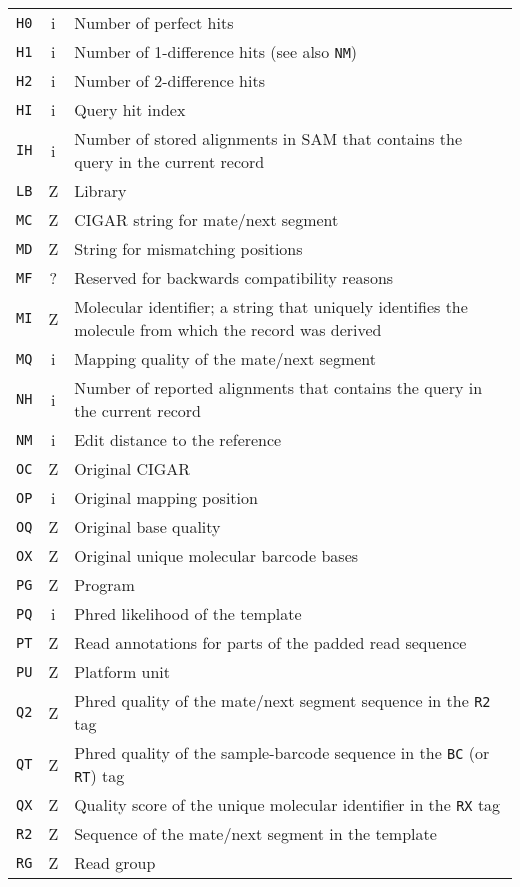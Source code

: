 \documentclass[10pt]{article}
\begin{document}
\begin{center}
\begin{longtable}{ccp{12.5cm}}
  {\tt H0} & i & Number of perfect hits \\
  {\tt H1} & i & Number of 1-difference hits (see also {\tt NM}) \\
  {\tt H2} & i & Number of 2-difference hits \\
  {\tt HI} & i & Query hit index \\
  {\tt IH} & i & Number of stored alignments in SAM that contains the query in the current record \\
  {\tt LB} & Z & Library \\
  {\tt MC} & Z & CIGAR string for mate/next segment \\
  {\tt MD} & Z & String for mismatching positions \\
  {\tt MF} & ? & Reserved for backwards compatibility reasons \\
  {\tt MI} & Z & Molecular identifier; a string that uniquely identifies the molecule from which the record was derived \\
  {\tt MQ} & i & Mapping quality of the mate/next segment \\
  {\tt NH} & i & Number of reported alignments that contains the query in the current record \\
  {\tt NM} & i & Edit distance to the reference \\
  {\tt OC} & Z & Original CIGAR \\
  {\tt OP} & i & Original mapping position \\
  {\tt OQ} & Z & Original base quality \\
  {\tt OX} & Z & Original unique molecular barcode bases \\
  {\tt PG} & Z & Program \\
  {\tt PQ} & i & Phred likelihood of the template \\
  {\tt PT} & Z & Read annotations for parts of the padded read sequence \\
  {\tt PU} & Z & Platform unit \\
  {\tt Q2} & Z & Phred quality of the mate/next segment sequence in the {\tt R2} tag \\
  {\tt QT} & Z & Phred quality of the sample-barcode sequence in the {\tt BC} (or {\tt RT}) tag \\
  {\tt QX} & Z & Quality score of the unique molecular identifier in the {\tt RX} tag \\
  {\tt R2} & Z & Sequence of the mate/next segment in the template \\
  {\tt RG} & Z & Read group \\

\end{longtable}
\end{center}
\end{document}
